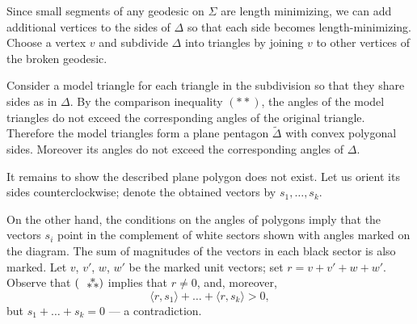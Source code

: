 \documentclass[oneside,a4paper]{amsart}
\begin{document}
Since small segments of any geodesic on $\Sigma$ are length minimizing, we can add additional vertices to the sides of $\Delta$ so that each side becomes length-minimizing.
Choose a vertex $v$ and subdivide $\Delta$ into triangles by joining $v$ to other vertices of the broken geodesic.

Consider a model triangle for each triangle in the subdivision so that they share sides as in $\Delta$.
By the comparison inequality $({*}{*})$, the angles of the model triangles do not exceed the corresponding angles of the original triangle.
Therefore the model triangles form a plane pentagon $\tilde\Delta$ with convex polygonal sides.
Moreover its angles do not exceed the corresponding angles of $\Delta$.


It remains to show the described plane polygon does not exist.
Let us orient its  sides counterclockwise;
denote the obtained vectors by $s_1,\dots,s_k$.

On the other hand, the conditions on the angles of polygons imply that the vectors $s_i$ point in the complement of white sectors shown with angles marked on the diagram.
The sum of magnitudes of the vectors in each black sector is also marked.
Let $v$, $v'$, $w$, $w'$ be the marked unit vectors;
set $r=v+v'+w+w'$.
Observe that $(\asterism)$ implies that $r\ne 0$,
and, moreover, 
\[\langle r,s_1\rangle+\dots+\langle r,s_k\rangle>0,\]
but  $s_1+\dots+s_k=0$ --- a contradiction.


{\sloppy
\printbibliography[heading=bibintoc]
\fussy
}
\end{document}
